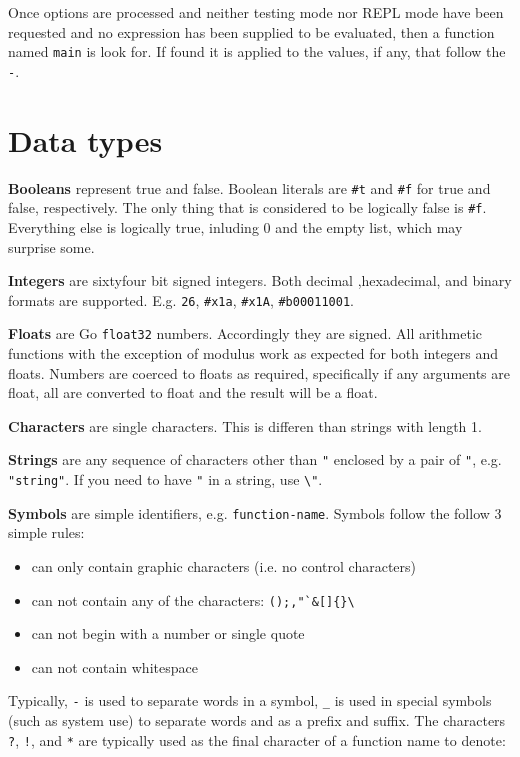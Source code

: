 \documentclass{article}
\begin{document}
Once options are processed and neither testing mode nor REPL mode have been requested and no
expression has been supplied to be evaluated, then a
function named \verb|main| is look for. If found it is applied to the values, if any, that
follow the \verb|-|.

\section{Data types}\label{sec:data-types}

\textbf{Booleans} represent true and false. Boolean literals are \verb|#t| and \verb|#f|
for true and false, respectively. The only thing that is considered to be logically false is
\verb|#f|. Everything else is logically true, inluding 0 and the empty list, which may
surprise some.

\textbf{Integers} are sixtyfour bit signed integers. Both decimal ,hexadecimal, and binary
formats are supported. E.g. \verb|26|, \verb|#x1a|, \verb|#x1A|, \verb|#b00011001|.

\textbf{Floats} are Go \verb|float32| numbers. Accordingly they are signed. All arithmetic
functions with the exception of modulus work as expected for both integers and floats. Numbers
are coerced to floats as required, specifically if any arguments are float, all are converted
to float and the result will be a float.

\textbf{Characters} are single characters. This is differen than strings with length 1.

\textbf{Strings} are any sequence of characters other than \verb|"| enclosed by a pair of
\verb|"|, e.g. \verb|"string"|. If you need to have \verb|"| in a string, use
\verb|\"|.

\textbf{Symbols} are simple identifiers, e.g. \verb|function-name|. Symbols follow the
follow 3 simple rules:

\begin{itemize}
\item can only contain graphic characters (i.e. no control characters)
\item can not contain any of the characters: \verb|();,"`&[]{}\|
\item can not begin with a number or single quote
\item can not contain whitespace
\end{itemize}

Typically, \verb|-| is used to separate words in a symbol, \verb|_| is used in special
symbols (such as system use) to separate words and as a prefix and suffix. The characters
\verb|?|, \verb|!|, and \verb|*| are typically used as the final character of a function
name to denote:
\end{document}
